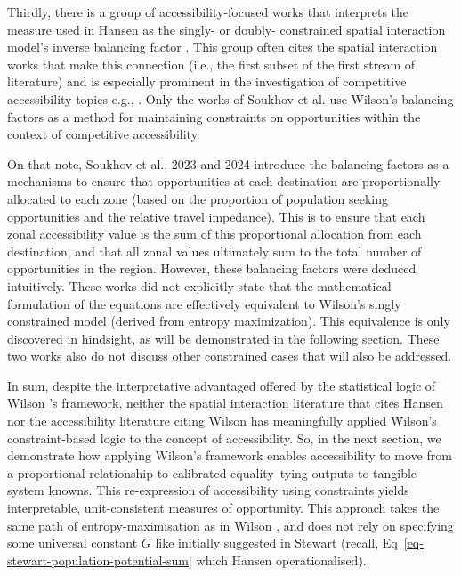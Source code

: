 \documentclass[
  10pt,
  letterpaper,
]{article}
\begin{document}
Thirdly, there is a group of accessibility-focused works that interprets
the measure used in Hansen \citep{hansen1959} as the singly- or doubly-
constrained spatial interaction model's inverse balancing factor
\citep[e.g.,][]{vickermanAccessibilityAttractionPotential1974}. This
group often cites the spatial interaction works that make this
connection (i.e., the first subset of the first stream of literature)
and is especially prominent in the investigation of competitive
accessibility topics e.g.,
\citep{karstEvaluationAccessibilityImpacts2003, geurs2006accessibility, willigers2007accessibility, el2011place, curtis2010planning, manaugh2012makes, chen2013regional, alonso2014labour, albacete2017measuring, sahebgharani2019computing, mayaud2019future, allenMeasureCompetitiveAccess2020, levinsonGeneralTheoryAccess2020, marwal2022literature, su2023untangling}.
Only the works of Soukhov et al.
\citep{soukhovIntroducingSpatialAvailability2023, soukhovMultimodalSpatialAvailability2024}
use Wilson's \citep{wilson1971} balancing factors as a method for
maintaining constraints on opportunities within the context of
competitive accessibility.

On that note, Soukhov et al., 2023 and 2024
\citep{soukhovIntroducingSpatialAvailability2023, soukhovMultimodalSpatialAvailability2024}
introduce the balancing factors as a mechanisms to ensure that
opportunities at each destination are proportionally allocated to each
zone (based on the proportion of population seeking opportunities and
the relative travel impedance). This is to ensure that each zonal
accessibility value is the sum of this proportional allocation from each
destination, and that all zonal values ultimately sum to the total
number of opportunities in the region. However, these balancing factors
were deduced intuitively. These works did not explicitly state that the
mathematical formulation of the equations are effectively equivalent to
Wilson's singly constrained model (derived from entropy maximization).
This equivalence is only discovered in hindsight, as will be
demonstrated in the following section. These two works also do not
discuss other constrained cases that will also be addressed.

In sum, despite the interpretative advantaged offered by the statistical
logic of Wilson \citep{wilson1971}'s framework, neither the spatial
interaction literature that cites Hansen \citep{hansen1959} nor the
accessibility literature citing Wilson \citep{wilson1971} has
meaningfully applied Wilson's constraint-based logic to the concept of
accessibility. So, in the next section, we demonstrate how applying
Wilson's framework enables accessibility to move from a proportional
relationship to calibrated equality--tying outputs to tangible system
knowns. This re-expression of accessibility using constraints yields
interpretable, unit-consistent measures of opportunity. This approach
takes the same path of entropy-maximisation as in Wilson
\citep{wilson1971}, and does not rely on specifying some universal
constant \(G\) like initially suggested in Stewart
\citep{stewartDemographicGravitationEvidence1948} (recall,
Eq~\ref{eq-stewart-population-potential-sum} which Hansen
\citep{hansen1959} operationalised).
\end{document}
